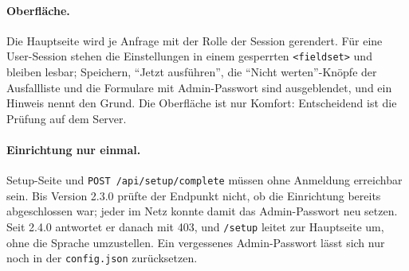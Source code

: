 \paragraph{Oberfläche.} Die Hauptseite wird je Anfrage mit der Rolle der Session gerendert.
Für eine User-Session stehen die Einstellungen in einem gesperrten \texttt{<fieldset>} und
bleiben lesbar; Speichern, \enquote{Jetzt ausführen}, die \enquote{Nicht werten}-Knöpfe der
Ausfallliste und die Formulare mit Admin-Passwort sind ausgeblendet, und ein Hinweis nennt
den Grund. Die Oberfläche ist nur Komfort: Entscheidend ist die Prüfung auf dem Server.

\paragraph{Einrichtung nur einmal.} Setup-Seite und \texttt{POST /api/setup/complete} müssen
ohne Anmeldung erreichbar sein. Bis Version 2.3.0 prüfte der Endpunkt nicht, ob die
Einrichtung bereits abgeschlossen war; jeder im Netz konnte damit das Admin-Passwort neu
setzen. Seit 2.4.0 antwortet er danach mit 403, und \texttt{/setup} leitet zur Hauptseite um,
ohne die Sprache umzustellen. Ein vergessenes Admin-Passwort lässt sich nur noch in der
\texttt{config.json} zurücksetzen.
